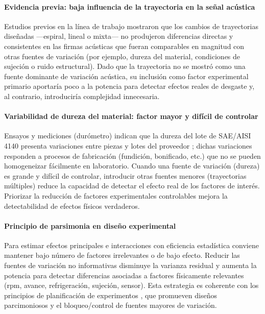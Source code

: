 \documentclass[12pt, letterpaper]{report}
\begin{document}
\paragraph{Evidencia previa: baja influencia de la trayectoria en la señal acústica}

 Estudios previos en la línea de trabajo \cite{orejarena2014} mostraron que los cambios de trayectorias diseñadas ---espiral, lineal o mixta--- no produjeron diferencias directas y consistentes en las firmas acústicas que fueran comparables en magnitud con otras fuentes de variación (por ejemplo, dureza del material, condiciones de sujeción o ruido estructural). Dado que la trayectoria no se mostró como una fuente dominante de variación acústica, su inclusión como factor experimental primario aportaría poco a la potencia para detectar efectos reales de desgaste y, al contrario, introduciría complejidad innecesaria.

\paragraph{Variabilidad de dureza del material: factor mayor y difícil de controlar}

Ensayos y mediciones (durómetro) indican que la dureza del lote de SAE/AISI 4140 presenta variaciones entre piezas y lotes del proveedor ; dichas variaciones responden a procesos de fabricación (fundición, bonificado, etc.) que no se pueden homogeneizar fácilmente en laboratorio. Cuando una fuente de variación (dureza) es grande y difícil de controlar, introducir otras fuentes menores (trayectorias múltiples) reduce la capacidad de detectar el efecto real de los factores de interés. Priorizar la reducción de factores experimentales controlables mejora la detectabilidad de efectos físicos verdaderos.

\paragraph{Principio de parsimonia en diseño experimental}

Para estimar efectos principales e interacciones con eficiencia estadística conviene mantener bajo número de factores irrelevantes o de bajo efecto. Reducir las fuentes de variación no informativas disminuye la varianza residual y aumenta la potencia para detectar diferencias asociadas a factores físicamente relevantes (rpm, avance, refrigeración, sujeción, sensor). Esta estrategia es coherente con los principios de planificación de experimentos , que promueven diseños parcimoniosos y el bloqueo/control de fuentes mayores de variación.
\end{document}
